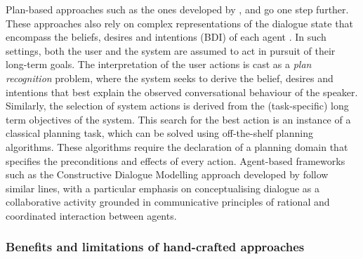 Plan-based approaches such as the ones developed by \cite{Freedman:2000}, \cite{RichSidner98umuai} and \cite{Allen:2000:AGD:973935.973937} go one step further. These approaches also rely on complex representations of the dialogue state that encompass the beliefs, desires and intentions (BDI) of each agent \citep{Cohen1979,Allen1980}.  In such settings, both the user and the system are assumed to act in pursuit of their long-term goals.  The interpretation of the user actions is cast as a \textit{plan recognition} problem, where the system seeks to derive the belief, desires and intentions that best explain the observed conversational behaviour of the speaker.  Similarly, the selection of system actions is derived from the (task-specific) long term objectives of the system. This search for the best action is an instance of a classical planning task, which can be solved using off-the-shelf planning algorithms. These algorithms require the declaration of a planning domain that specifies the preconditions and effects of every action.  Agent-based frameworks such as the Constructive Dialogue Modelling approach developed by \cite{Jokinen:2009} follow similar lines, with a particular emphasis on conceptualising dialogue as a collaborative activity grounded in communicative principles of rational and coordinated interaction between agents. 

\subsubsection*{Benefits and limitations of hand-crafted approaches}

